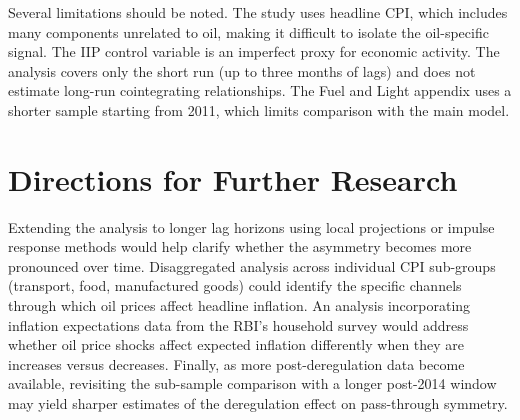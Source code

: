 Several limitations should be noted. The study uses headline CPI, which includes many components unrelated to oil, making it difficult to isolate the oil-specific signal. The IIP control variable is an imperfect proxy for economic activity. The analysis covers only the short run (up to three months of lags) and does not estimate long-run cointegrating relationships. The Fuel and Light appendix uses a shorter sample starting from 2011, which limits comparison with the main model.

\section{Directions for Further Research}

Extending the analysis to longer lag horizons using local projections or impulse response methods would help clarify whether the asymmetry becomes more pronounced over time. Disaggregated analysis across individual CPI sub-groups (transport, food, manufactured goods) could identify the specific channels through which oil prices affect headline inflation. An analysis incorporating inflation expectations data from the RBI's household survey would address whether oil price shocks affect expected inflation differently when they are increases versus decreases. Finally, as more post-deregulation data become available, revisiting the sub-sample comparison with a longer post-2014 window may yield sharper estimates of the deregulation effect on pass-through symmetry.
